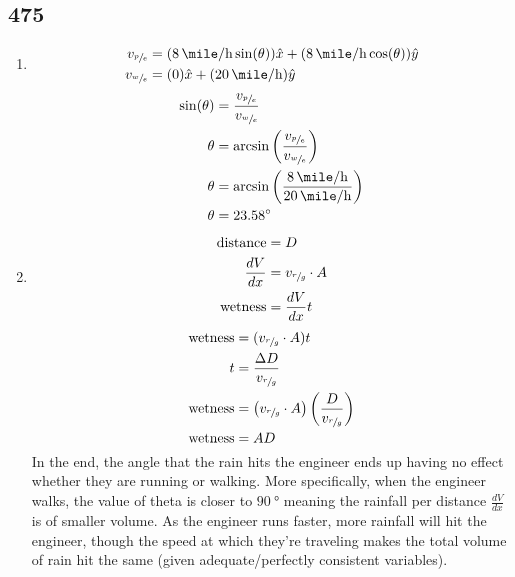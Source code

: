 \documentclass{article}
\begin{document}
\subsection{475}
\begin{enumerate}[label=\textbf{(a)}]
	\item
		\begin{align*}
			v_{\sfrac{p}{e}} & = (\SI{8}{\mile \per \hour}\sin(\theta))\hat{x} + (\SI{8}{\mile \per \hour}\cos(\theta))\hat{y} \\
			v_{\sfrac{w}{e}} & = (0)\hat{x} + (\SI{20}{\mile \per \hour})\hat{y}
		\end{align*}
		\begin{align*}
			\sin(\theta) & = \frac{v_{\sfrac{p}{e}}}{v_{\sfrac{w}{e}}} \\
			\theta & = \arcsin \left( \frac{v_{\sfrac{p}{e}}}{v_{\sfrac{w}{e}}} \right) \\
			\theta & = \arcsin \left( \frac{\SI{8}{\mile \per \hour}}{\SI{20}{\mile \per \hour}} \right) \\
			\theta & = \SI{23.58}{\degree}
		\end{align*}
	\item
		\begin{align*}
			\text{distance} & = D \\
			\frac{dV}{dx} & = v_{\sfrac{r}{g}} \cdot A \\
			\text{wetness} & = \frac{dV}{dx}t
		\end{align*}
		\begin{align*}
			\text{wetness} & = (v_{\sfrac{r}{g}} \cdot A)t \\
			t & = \frac{\Delta D}{v_{\sfrac{r}{g}}} \\
			\text{wetness} & = \left( v_{\sfrac{r}{g}} \cdot A \right) \left( \frac{D}{v_{\sfrac{r}{g}}} \right) \\
			\text{wetness} & = AD
		\end{align*}
		In the end, the angle that the rain hits the engineer ends up having no effect whether they are running or walking. More specifically, when the engineer walks, the value of theta is closer to $ \SI{90}{\degree} $ meaning the rainfall per distance $ \frac{dV}{dx} $ is of smaller volume. As the engineer runs faster, more rainfall will hit the engineer, though the speed at which they're traveling makes the total volume of rain hit the same (given adequate/perfectly consistent variables).
\end{enumerate}
\end{document}
